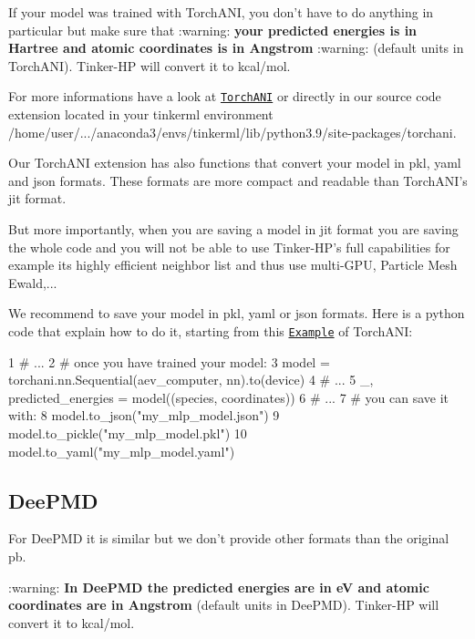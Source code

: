 If your {\ttfamily model} was trained with Torch\-A\-N\-I, you don't have to do anything in particular but make sure that \-:warning\-: {\bfseries your predicted energies is in Hartree and atomic coordinates is in Angstrom} \-:warning\-: (default units in Torch\-A\-N\-I). Tinker-\/\-H\-P will convert it to kcal/mol. \par
 For more informations have a look at \href{https://aiqm.github.io/torchani/examples/energy_force.html}{\tt Torch\-A\-N\-I} or directly in our source code extension located in your tinkerml environment {\ttfamily /home/user/.../anaconda3/envs/tinkerml/lib/python3.9/site-\/packages/torchani}. \par
 Our Torch\-A\-N\-I extension has also functions that convert your {\ttfamily model} in {\ttfamily pkl}, {\ttfamily yaml} and {\ttfamily json} formats. These formats are more compact and readable than Torch\-A\-N\-I's {\ttfamily jit} format. \par
 But more importantly, when you are saving a {\ttfamily model} in {\ttfamily jit} format you are saving the whole code and you will not be able to use Tinker-\/\-H\-P's full capabilities for example its highly efficient neighbor list and thus use multi-\/\-G\-P\-U, Particle Mesh Ewald,... \par
 We recommend to save your model in {\ttfamily pkl}, {\ttfamily yaml} or {\ttfamily json} formats. Here is a python code that explain how to do it, starting from this \href{https://aiqm.github.io/torchani/examples/nnp_training.html}{\tt Example} of Torch\-A\-N\-I\-:


\begin{DoxyCode}
1 \textcolor{comment}{# ...}
2 \textcolor{comment}{# once you have trained your model:}
3 model = torchani.nn.Sequential(aev\_computer, nn).to(device)
4 \textcolor{comment}{# ...}
5 \_, predicted\_energies = model((species, coordinates))
6 \textcolor{comment}{# ...}
7 \textcolor{comment}{# you can save it with:}
8 model.to\_json(\textcolor{stringliteral}{"my\_mlp\_model.json"})
9 model.to\_pickle(\textcolor{stringliteral}{"my\_mlp\_model.pkl"})
10 model.to\_yaml(\textcolor{stringliteral}{"my\_mlp\_model.yaml"})
\end{DoxyCode}


\subsection*{Dee\-P\-M\-D}

For Dee\-P\-M\-D it is similar but we don't provide other formats than the original {\ttfamily pb}. \par
 \-:warning\-: {\bfseries In Dee\-P\-M\-D the predicted energies are in e\-V and atomic coordinates are in Angstrom} (default units in Dee\-P\-M\-D). Tinker-\/\-H\-P will convert it to kcal/mol.

